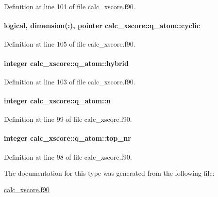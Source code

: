 Definition at line 101 of file calc\-\_\-xscore.\-f90.

\hypertarget{structcalc__xscore_1_1q__atom_a75e2c42e139bf380e09f9d4a6d6251bd}{
\paragraph[{cyclic}]{\setlength{\rightskip}{0pt plus 5cm}logical, dimension(\-:), pointer calc\-\_\-xscore\-::q\-\_\-atom\-::cyclic}}\label{structcalc__xscore_1_1q__atom_a75e2c42e139bf380e09f9d4a6d6251bd}


Definition at line 105 of file calc\-\_\-xscore.\-f90.

\hypertarget{structcalc__xscore_1_1q__atom_a9456289faa736d24b4d3599f14aa118f}{
\paragraph[{hybrid}]{\setlength{\rightskip}{0pt plus 5cm}integer calc\-\_\-xscore\-::q\-\_\-atom\-::hybrid}}\label{structcalc__xscore_1_1q__atom_a9456289faa736d24b4d3599f14aa118f}


Definition at line 103 of file calc\-\_\-xscore.\-f90.

\hypertarget{structcalc__xscore_1_1q__atom_ae5567a8513707eb98c99237a5017940b}{
\paragraph[{n}]{\setlength{\rightskip}{0pt plus 5cm}integer calc\-\_\-xscore\-::q\-\_\-atom\-::n}}\label{structcalc__xscore_1_1q__atom_ae5567a8513707eb98c99237a5017940b}


Definition at line 99 of file calc\-\_\-xscore.\-f90.

\hypertarget{structcalc__xscore_1_1q__atom_a4a8f3beed64e684110a227831bb975bb}{
\paragraph[{top\-\_\-nr}]{\setlength{\rightskip}{0pt plus 5cm}integer calc\-\_\-xscore\-::q\-\_\-atom\-::top\-\_\-nr}}\label{structcalc__xscore_1_1q__atom_a4a8f3beed64e684110a227831bb975bb}


Definition at line 98 of file calc\-\_\-xscore.\-f90.



The documentation for this type was generated from the following file\-:\begin{DoxyCompactItemize}
\item 
\hyperlink{calc__xscore_8f90}{calc\-\_\-xscore.\-f90}\end{DoxyCompactItemize}
